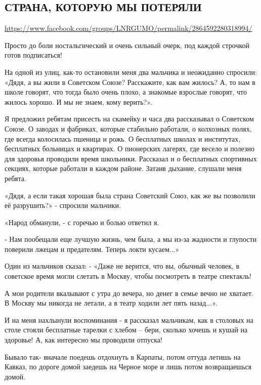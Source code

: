  
 
  
\subsection{СТРАНА, КОТОРУЮ МЫ ПОТЕРЯЛИ}
\url{https://www.facebook.com/groups/LNRGUMO/permalink/2864592280318994/}


Просто до боли ностальгический и очень сильный очерк, под каждой строчкой готов
подписаться!

На одной из улиц, как-то остановили меня два мальчика и неожиданно спросили:
«Дядя, а вы жили в Советском Союзе? Расскажите, как вам жилось? А, то нам в
школе говорят, что тогда было очень плохо, а знакомые взрослые говорят, что
жилось хорошо. И мы не знаем, кому верить?».

Я предложил ребятам присесть на скамейку и часа два рассказывал о Советском
Союзе. О заводах и фабриках, которые стабильно работали, о колхозных полях, где
всегда колосилась пшеница и рожь. О бесплатных школах и институтах, бесплатных
больницах и квартирах.  О пионерских лагерях, где весело и полезно для здоровья
проводили время школьники. Рассказал и о бесплатных спортивных секциях, которые
работали в каждом районе.  Затаив дыхание, слушали меня ребята.

«Дядя, а если такая хорошая была страна Советский Союз, как же вы позволили её
разрушить?» - спросили мальчики.

«Народ обманули, - с горечью и болью ответил я.

- Нам пообещали еще лучшую жизнь, чем была, а мы из-за жадности и глупости
поверили лжецам и предателям. Теперь локти кусаем...»

Один из мальчиков сказал: - «Даже не верится, что вы, обычный человек, в
советское время могли слетать в Москву, чтобы посмотреть в театре спектакль!

А мои родители вкалывают с утра до вечера, но денег в семье вечно не хватает. В
Москву мы никогда не летали, а в театр ходили лет пять назад...».

И на меня нахлынули воспоминания - я рассказал мальчикам, как в столовых на
столе стояли бесплатные тарелки с хлебом – бери, сколько хочешь и кушай на
здоровье! А, как интересно мы проводили отпуска!

Бывало так- вначале поедешь отдохнуть в Карпаты, потом оттуда летишь на Кавказ,
по дороге домой заедешь на Черное море и лишь потом возвращаешься домой.

